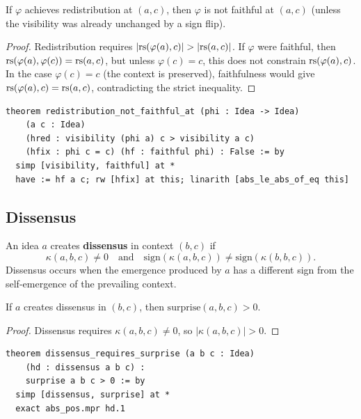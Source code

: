 \begin{theorem}
\label{thm:redistribution-visibility}
If $\varphi$ achieves redistribution at $(a, c)$, then
$\varphi$ is not faithful at $(a, c)$ (unless the visibility was already
unchanged by a sign flip).
\end{theorem}

\begin{proof}
Redistribution requires $|\mathrm{rs}(\varphi(a), c)| > |\mathrm{rs}(a, c)|$.  If $\varphi$
were faithful, then $\mathrm{rs}(\varphi(a), \varphi(c)) = \mathrm{rs}(a, c)$, but unless
$\varphi(c) = c$, this does not constrain $\mathrm{rs}(\varphi(a), c)$.  In the
case $\varphi(c) = c$ (the context is preserved), faithfulness would give
$\mathrm{rs}(\varphi(a), c) = \mathrm{rs}(a, c)$, contradicting the strict inequality.
\end{proof}

\begin{lstlisting}
theorem redistribution_not_faithful_at (phi : Idea -> Idea)
    (a c : Idea)
    (hred : visibility (phi a) c > visibility a c)
    (hfix : phi c = c) (hf : faithful phi) : False := by
  simp [visibility, faithful] at *
  have := hf a c; rw [hfix] at this; linarith [abs_le_abs_of_eq this]
\end{lstlisting}

\subsection{Dissensus}

\begin{definition}[Dissensus]
\label{def:dissensus}
An idea $a$ creates \textbf{dissensus} in context $(b, c)$ if
\[
  \kappa(a, b, c) \neq 0
  \quad \text{and} \quad
  \mathrm{sign}(\kappa(a, b, c)) \neq \mathrm{sign}(\kappa(b, b, c)).
\]
Dissensus occurs when the emergence produced by $a$ has a different sign
from the self-emergence of the prevailing context.
\end{definition}

\begin{theorem}
\label{thm:dissensus-surprise}
If $a$ creates dissensus in $(b, c)$, then $\mathrm{surprise}(a, b, c) > 0$.
\end{theorem}

\begin{proof}
Dissensus requires $\kappa(a, b, c) \neq 0$, so
$|\kappa(a, b, c)| > 0$.
\end{proof}

\begin{lstlisting}
theorem dissensus_requires_surprise (a b c : Idea)
    (hd : dissensus a b c) :
    surprise a b c > 0 := by
  simp [dissensus, surprise] at *
  exact abs_pos.mpr hd.1
\end{lstlisting}

